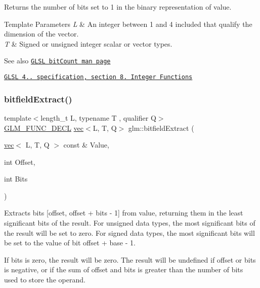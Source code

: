 Returns the number of bits set to 1 in the binary representation of value.


\begin{DoxyTemplParams}{Template Parameters}
{\em L} & An integer between 1 and 4 included that qualify the dimension of the vector. \\
\hline
{\em T} & Signed or unsigned integer scalar or vector types.\\
\hline
\end{DoxyTemplParams}
\begin{DoxySeeAlso}{See also}
\href{http://www.opengl.org/sdk/docs/manglsl/xhtml/bitCount.xml}{\tt G\+L\+SL bit\+Count man page} 

\href{http://www.opengl.org/registry/doc/GLSLangSpec.4.20.8.pdf}{\tt G\+L\+SL 4.. specification, section 8. Integer Functions} 
\end{DoxySeeAlso}
\mbox{\label{group__core__func__integer_ga346b25ab11e793e91a4a69c8aa6819f2}} 
\subsubsection{\texorpdfstring{bitfield\+Extract()}{bitfieldExtract()}}
{\footnotesize\ttfamily template$<$length\+\_\+t L, typename T , qualifier Q$>$ \\
\mbox{\hyperlink{setup_8hpp_ab2d052de21a70539923e9bcbf6e83a51}{G\+L\+M\+\_\+\+F\+U\+N\+C\+\_\+\+D\+E\+CL}} \mbox{\hyperlink{structglm_1_1vec}{vec}}$<$L, T, Q$>$ glm\+::bitfield\+Extract (\begin{DoxyParamCaption}\item[{\mbox{\hyperlink{structglm_1_1vec}{vec}}$<$ L, T, Q $>$ const \&}]{Value,  }\item[{int}]{Offset,  }\item[{int}]{Bits }\end{DoxyParamCaption})}

Extracts bits \mbox{[}offset, offset + bits -\/ 1\mbox{]} from value, returning them in the least significant bits of the result. For unsigned data types, the most significant bits of the result will be set to zero. For signed data types, the most significant bits will be set to the value of bit offset + base -\/ 1.

If bits is zero, the result will be zero. The result will be undefined if offset or bits is negative, or if the sum of offset and bits is greater than the number of bits used to store the operand.



